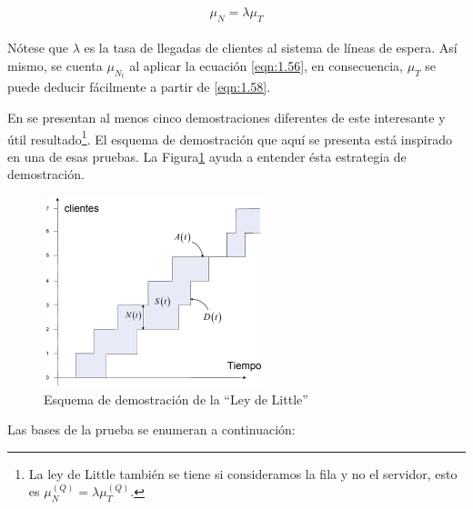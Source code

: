 \begin{equation}
    \mu_{N} = \lambda \mu_{T}
    \label{eqn:1.58}
\end{equation}
\\
Nótese que $ \lambda $ es la tasa de llegadas de clientes al sistema de líneas de espera. Así mismo, se cuenta $ \mu_{N_{t}} $ al aplicar la ecuación \ref{eqn:1.56}, en consecuencia, $ \mu_{T} $ se puede deducir fácilmente a partir de \ref{eqn:1.58}.

En \cite{kleinrock1975} se presentan al menos cinco demostraciones diferentes de este interesante y útil resultado\footnote{La ley de Little también se tiene si consideramos la fila y no el servidor, 
esto es $ \mu_{N}^{\left ( Q \right )}=\lambda \mu_{T}^{\left ( Q \right )}. $}. El esquema de demostración que aquí se presenta está inspirado en una de esas pruebas. La Figura\ref{fig:mesh9} ayuda a entender ésta estrategia de demostración.

\begin{figure}[H]
\centering
\includegraphics[width=2.5in]{chapters/chapter3/figures/Figura1-9:EsquemadedemostraciondelaLeydeLittle.png}
\caption[Esquema de demostración de la ``Ley de Little'']{Esquema de demostración de la ``Ley de Little''}
\label{fig:mesh9}
\end{figure} 

Las bases de la prueba se enumeran a continuación:

